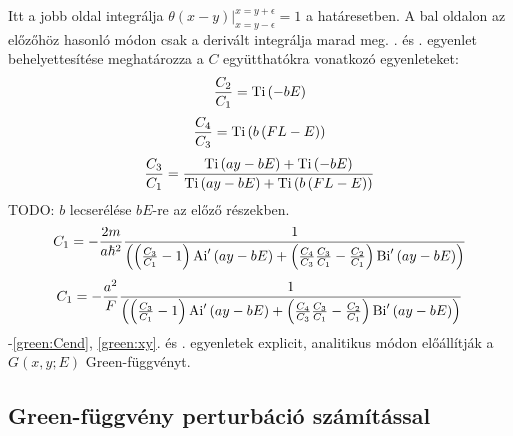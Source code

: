 Itt a jobb oldal integrálja $\left. \theta\left(x - y\right) \right\rvert_{x = y - \epsilon}^{x = y + \epsilon} = 1$ a határesetben. A bal oldalon az előzőhöz hasonló módon csak a derivált integrálja marad meg. . és . egyenlet behelyettesítése meghatározza a $C$ együtthatókra vonatkozó egyenleteket:
\begin{equation}
	\frac{C_2}{C_1} = \mathrm{Ti}\left(-bE\right)
	\label{green:Cbegin}
\end{equation}
\begin{equation}
	\frac{C_4}{C_3} = \mathrm{Ti}\left(b\left(FL - E\right)\right)
\end{equation}
\begin{equation}
	\frac{C_3}{C_1} = \frac{\mathrm{Ti}\left(ay - bE\right) + \mathrm{Ti}\left(-bE\right)}{\mathrm{Ti}\left(ay - bE\right) + \mathrm{Ti}\left(b\left(FL - E\right)\right)}
\end{equation}
TODO: $b$ lecserélése $bE$-re az előző részekben.
\begin{equation}
	C_1 = -\frac{2m}{a\hbar^2}\frac{1}{\left( \left(\frac{C_3}{C_1}-1\right)\mathrm{Ai}^\prime\left(ay - bE\right) + \left(\frac{C_4}{C_3}\frac{C_3}{C_1} - \frac{C_2}{C_1}\right) \mathrm{Bi}^\prime\left(ay - bE\right) \right)}
	\label{green:Cend}
\end{equation}
\begin{equation}
	C_1 = -\frac{a^2}{F}\frac{1}{\left( \left(\frac{C_3}{C_1}-1\right)\mathrm{Ai}^\prime\left(ay - bE\right) + \left(\frac{C_4}{C_3}\frac{C_3}{C_1} - \frac{C_2}{C_1}\right) \mathrm{Bi}^\prime\left(ay - bE\right) \right)}
\end{equation}
-\ref{green:Cend}, \ref{green:xy}. és . egyenletek explicit, analitikus módon előállítják a $G\left( x, y; E \right)$ Green-függvényt.
\subsection{Green-függvény perturbáció számítással}





